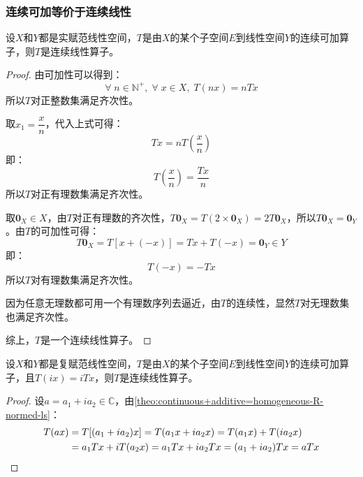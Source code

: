\subsubsection{连续可加等价于连续线性}
\begin{theorem}\label{theo:continuous+additive=homogeneous-R-normed-ls}
	设$X$和$Y$都是实赋范线性空间，$T$是由$X$的某个子空间$E$到线性空间$Y$的连续可加算子，则$T$是连续线性算子。
\end{theorem}
\begin{proof}
	由可加性可以得到：
	\begin{equation*}
		\forall\;n\in\mathbb{N}^+,\;\forall\;x\in X,\;T(nx)=nTx
	\end{equation*}	
	所以$T$对正整数集满足齐次性。\par
	取$x_1=\dfrac{x}{n}$，代入上式可得：
	\begin{equation*}
		Tx=nT\left(\frac{x}{n}\right)
	\end{equation*}
	即：
	\begin{equation*}
		T\left(\frac{x}{n}\right)=\frac{Tx}{n}
	\end{equation*}
	所以$T$对正有理数集满足齐次性。\par
	取$\mathbf{0}_X\in X$，由$T$对正有理数的齐次性，$T\mathbf{0}_X=T(2\times\mathbf{0}_X)=2T\mathbf{0}_X$，所以$T\mathbf{0}_X=\mathbf{0}_Y$。由$T$的可加性可得：
	\begin{equation*}
		T\mathbf{0}_X=T[x+(-x)]=Tx+T(-x)=\mathbf{0}_Y\in Y
	\end{equation*}
	即：
	\begin{equation*}
		T(-x)=-Tx
	\end{equation*}
	所以$T$对有理数集满足齐次性。\par
	因为任意无理数都可用一个有理数序列去逼近，由$T$的连续性，显然$T$对无理数集也满足齐次性。\par
	综上，$T$是一个连续线性算子。
\end{proof}
\begin{theorem}
	设$X$和$Y$都是复赋范线性空间，$T$是由$X$的某个子空间$E$到线性空间$Y$的连续可加算子，且$T(ix)=iTx$，则$T$是连续线性算子。
\end{theorem}
\begin{proof}
	设$a=a_1+ia_2\in\mathbb{C}$，由\cref{theo:continuous+additive=homogeneous-R-normed-ls}：
	\begin{align*}
		T(ax)&=T[(a_1+ia_2)x]=T(a_1x+ia_2x)=T(a_1x)+T(ia_2x) \\
		&=a_1Tx+iT(a_2x)=a_1Tx+ia_2Tx=(a_1+ia_2)Tx=aTx\qedhere
	\end{align*}
\end{proof}

